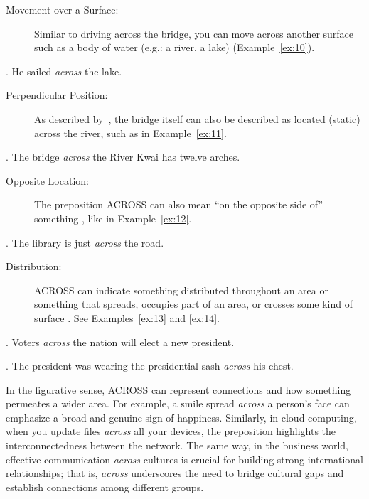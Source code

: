 {{\begin{description}
    \item [Movement over a Surface:] Similar to driving across the bridge, you can move across another surface such as a body of water (e.g.: a river, a lake) (Example~\ref{ex:10}).
\end{description}

    \ex. He sailed \emph{across} the lake.
    \label{ex:10}
    
\begin{description}
    \item [Perpendicular Position:] As described by~\textcite{bruckfield2011prepositions}, the bridge itself can also be described as located (static) across the river, such as in Example~\ref{ex:11}.
\end{description}

    \ex. The bridge \emph{across} the River Kwai has twelve arches. \label{ex:11}
    
\begin{description} 
    \item [Opposite Location:] The preposition ACROSS can also mean ``on the opposite side of'' something \parencite{cambridge-across}, like in Example~\ref{ex:12}.
\end{description}

    \ex. The library is just \emph{across} the road. 
    \label{ex:12}

\begin{description}
    \item [Distribution:] ACROSS can indicate something distributed throughout an area or something that spreads, occupies part of an area, or crosses some kind of surface \parencite{bruckfield2011prepositions}. See Examples~\ref{ex:13} and \ref{ex:14}.
\end{description}

    \ex. Voters \emph{across} the nation will elect a new president. \label{ex:13}

    \ex. The president was wearing the presidential sash \emph{across} his chest. \label{ex:14}


In the figurative sense, ACROSS can represent connections and how something permeates a wider area. For example, a smile spread \emph{across} a person's face can emphasize a broad and genuine sign of happiness. Similarly, in cloud computing, when you update files \emph{across} all your devices, the preposition highlights the interconnectedness between the network. The same way, in the business world, effective communication \emph{across} cultures is crucial for building strong international relationships; that is, \emph{across} underscores the need to bridge cultural gaps and establish connections among different groups.


}}
